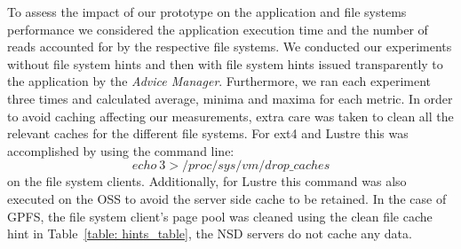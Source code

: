 To assess the impact of our prototype on the application and file systems performance we considered the application execution time and the number of reads accounted for by the respective file systems. We conducted our experiments without file system hints and then with file system hints issued transparently to the application by the \textit{Advice Manager}. Furthermore, we ran each experiment three times and calculated average, minima and maxima for each metric. In order to avoid caching affecting our measurements, extra care was taken to clean all the relevant caches for the different file systems. For ext4 and Lustre this was accomplished by using the command line: $$echo\ 3 > /proc/sys/vm/drop\_caches$$ on the file system clients. Additionally, for Lustre this command was also executed on the OSS to avoid the server side cache to be retained. In the case of GPFS, the file system client's page pool was cleaned using the clean file cache hint in Table~\ref{table: hints_table}, the NSD servers do not cache any data. 

